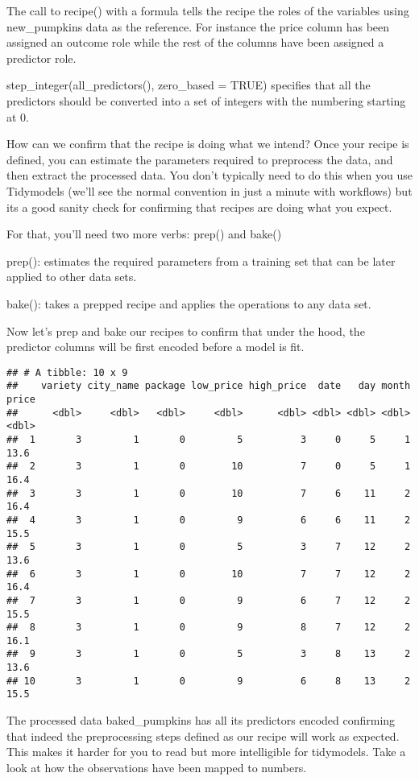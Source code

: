 \documentclass[
]{article}
\begin{document}
The call to recipe() with a formula tells the recipe the roles of the
variables using new\_pumpkins data as the reference. For instance the
price column has been assigned an outcome role while the rest of the
columns have been assigned a predictor role.

step\_integer(all\_predictors(), zero\_based = TRUE) specifies that all
the predictors should be converted into a set of integers with the
numbering starting at 0.

How can we confirm that the recipe is doing what we intend? Once your
recipe is defined, you can estimate the parameters required to
preprocess the data, and then extract the processed data. You don't
typically need to do this when you use Tidymodels (we'll see the normal
convention in just a minute with workflows) but its a good sanity check
for confirming that recipes are doing what you expect.

For that, you'll need two more verbs: prep() and bake()

prep(): estimates the required parameters from a training set that can
be later applied to other data sets.

bake(): takes a prepped recipe and applies the operations to any data
set.

Now let's prep and bake our recipes to confirm that under the hood, the
predictor columns will be first encoded before a model is fit.

\begin{verbatim}
## # A tibble: 10 x 9
##    variety city_name package low_price high_price  date   day month price
##      <dbl>     <dbl>   <dbl>     <dbl>      <dbl> <dbl> <dbl> <dbl> <dbl>
##  1       3         1       0         5          3     0     5     1  13.6
##  2       3         1       0        10          7     0     5     1  16.4
##  3       3         1       0        10          7     6    11     2  16.4
##  4       3         1       0         9          6     6    11     2  15.5
##  5       3         1       0         5          3     7    12     2  13.6
##  6       3         1       0        10          7     7    12     2  16.4
##  7       3         1       0         9          6     7    12     2  15.5
##  8       3         1       0         9          8     7    12     2  16.1
##  9       3         1       0         5          3     8    13     2  13.6
## 10       3         1       0         9          6     8    13     2  15.5
\end{verbatim}

The processed data baked\_pumpkins has all its predictors encoded
confirming that indeed the preprocessing steps defined as our recipe
will work as expected. This makes it harder for you to read but more
intelligible for tidymodels. Take a look at how the observations have
been mapped to numbers.
\end{document}
